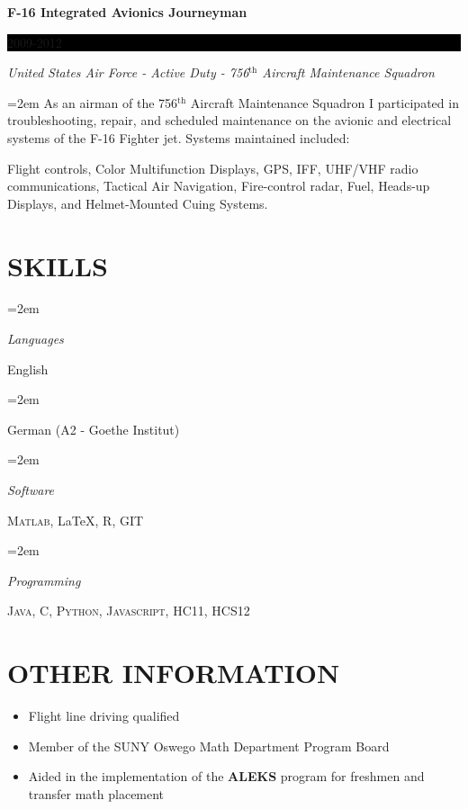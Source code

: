 \documentclass[paper=a4,fontsize=11pt]{scrartcl} %
\newlength{\spacebox}
\newcommand{\NewPart}[1]{\section*{\uppercase{#1}}}
\newcommand{\PersonalEntry}[2]{
		\noindent\hangindent=2em\hangafter=0 %
		\parbox{\spacebox}{        %
		\textit{#1}}		       %
		\hspace{1.5em} #2 \par}    %
\newcommand{\SkillsEntry}[2]{      %
		\noindent\hangindent=2em\hangafter=0 %
		\parbox{\spacebox}{        %
		\textit{#1}}			   %
		\hspace{1.5em} #2 \par}    %
\newcommand{\EducationEntry}[4]{
		\noindent \textbf{#1} \hfill      %
		\colorbox{Black}{%
			\parbox{6em}{%
			\hfill\color{White}#2}} \par  %
		\noindent \textit{#3} \par        %
		\noindent\hangindent=2em\hangafter=0 \small #4 %
		\normalsize \par}
\begin{document}
\EducationEntry{F-16 Integrated Avionics Journeyman}{\normalsize 2009-2012}{United States Air Force - Active Duty - 756$^{\text{th}}$ Aircraft Maintenance Squadron}{As an airman of the 756$^{\text{th}}$ Aircraft Maintenance Squadron I participated in troubleshooting, repair, and scheduled maintenance on the avionic and electrical systems of the F-16 Fighter jet. Systems maintained included:
\begin{center}
\begin{minipage}{10cm}
Flight controls, Color Multifunction Displays, GPS, IFF, UHF/VHF radio communications, Tactical Air Navigation, Fire-control radar, Fuel, Heads-up Displays, and Helmet-Mounted Cuing Systems.
\end{minipage}
\end{center}
}
\NewPart{\normalsize Skills}{}

\SkillsEntry{Languages}{English}
\SkillsEntry{}{German (A2 - Goethe Institut)}

\SkillsEntry{Software}{\textsc{Matlab}, \LaTeX, \textsc{R}, \textsc{GIT}}
\SkillsEntry{Programming}{\textsc{Java}, \textsc{C}, \textsc{Python}, \textsc{Javascript}, \textsc{HC11}, \textsc{HCS12}}


\NewPart{\normalsize Other Information}{}
\begin{itemize}
\setlength\itemsep{-.15cm}
\item[] Flight line driving qualified
\item[] Member of the SUNY Oswego Math Department Program Board
\item[] \hspace*{1cm} Aided in the implementation of the \textbf{ALEKS} program for freshmen and\\ \hspace*{1.05cm} transfer math placement
\end{itemize}
\end{document}
